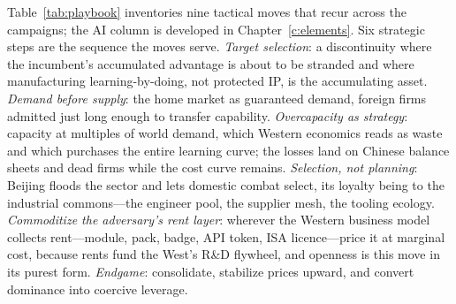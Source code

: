 Table~\ref{tab:playbook} inventories nine tactical moves that recur across the campaigns; the AI column is developed in Chapter~\ref{c:elements}. Six strategic steps are the sequence the moves serve. \emph{Target selection}: a discontinuity where the incumbent's accumulated advantage is about to be stranded and where manufacturing learning-by-doing, not protected IP, is the accumulating asset. \emph{Demand before supply}: the home market as guaranteed demand, foreign firms admitted just long enough to transfer capability. \emph{Overcapacity as strategy}: capacity at multiples of world demand, which Western economics reads as waste and which purchases the entire learning curve; the losses land on Chinese balance sheets and dead firms while the cost curve remains. \emph{Selection, not planning}: Beijing floods the sector and lets domestic combat select, its loyalty being to the industrial commons---the engineer pool, the supplier mesh, the tooling ecology. \emph{Commoditize the adversary's rent layer}: wherever the Western business model collects rent---module, pack, badge, API token, ISA licence---price it at marginal cost, because rents fund the West's R\&D flywheel, and openness is this move in its purest form. \emph{Endgame}: consolidate, stabilize prices upward, and convert dominance into coercive leverage.

